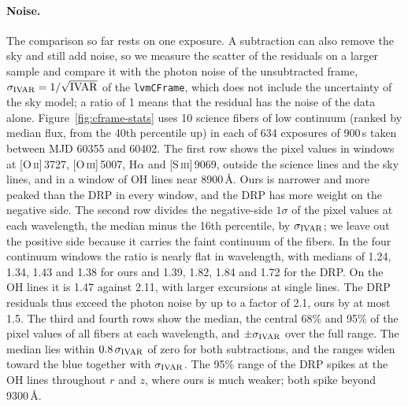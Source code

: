 \paragraph{Noise.} The comparison so far rests on one exposure. A subtraction
can also remove the sky and still add noise, so we measure the scatter of the
residuals on a larger sample and compare it with the photon noise of the
unsubtracted frame, $\sigma_{\rm IVAR}=1/\sqrt{\rm IVAR}$ of the
\texttt{lvmCFrame}, which does not include the uncertainty of the sky model; a
ratio of 1 means that the residual has the noise of the data alone. Figure~\ref{fig:cframe-stats} uses
10 science fibers of low continuum (ranked by median flux, from the 40th
percentile up) in each of 634 exposures of 900\,s taken between MJD 60355 and
60402. The first row shows the pixel values in windows at
[O\,\textsc{ii}]\,3727, [O\,\textsc{iii}]\,5007, H$\alpha$ and
[S\,\textsc{iii}]\,9069, outside the science lines and the sky lines, and in a
window of OH lines near 8900\,\AA. Ours is narrower and more peaked than the
DRP in every window, and the DRP has more weight on the negative side. The
second row divides the negative-side $1\sigma$ of the pixel values at each
wavelength, the median minus the 16th percentile, by $\sigma_{\rm IVAR}$; we
leave out the positive side because it carries the faint continuum of the
fibers. In the four continuum windows the ratio is nearly flat in wavelength,
with medians of 1.24, 1.34, 1.43 and 1.38 for ours and 1.39, 1.82, 1.84 and
1.72 for the DRP. On the OH lines it is 1.47 against 2.11, with larger
excursions at single lines. The DRP residuals thus exceed the photon noise by
up to a factor of 2.1, ours by at most 1.5. The third and fourth rows show the
median, the central 68\% and 95\% of the pixel values of all fibers at each
wavelength, and $\pm\sigma_{\rm IVAR}$ over the full range. The median lies
within $0.8\,\sigma_{\rm IVAR}$ of zero for both subtractions, and the ranges
widen toward the blue together with $\sigma_{\rm IVAR}$. The 95\% range of the
DRP spikes at the OH lines throughout $r$ and $z$, where ours is much weaker;
both spike beyond 9300\,\AA.

